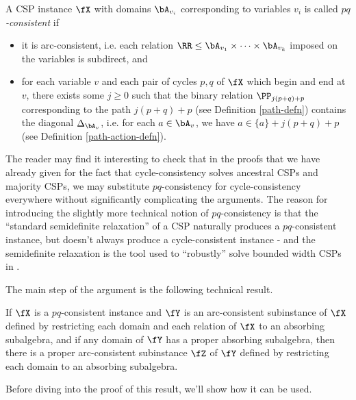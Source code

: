 \begin{defn}\label{defn-pq-consistent} A CSP instance $\fX$ with domains $\bA_{v_i}$ corresponding to variables $v_i$ is called $pq$\emph{-consistent} if
\begin{itemize}
\item it is arc-consistent, i.e. each relation $\RR \le \bA_{v_1}\times\cdots \times \bA_{v_k}$ imposed on the variables is subdirect, and
\item for each variable $v$ and each pair of cycles $p,q$ of $\fX$ which begin and end at $v$, there exists some $j \ge 0$ such that the binary relation $\PP_{j(p+q)+p}$ corresponding to the path $j(p+q)+p$ (see Definition \ref{path-defn}) contains the diagonal $\Delta_{\bA_v}$, i.e. for each $a \in \bA_v$, we have $a \in \{a\} + j(p+q)+p$ (see Definition \ref{path-action-defn}).
\end{itemize}
\end{defn}

The reader may find it interesting to check that in the proofs that we have already given for the fact that cycle-consistency solves ancestral CSPs and majority CSPs, we may substitute $pq$-consistency for cycle-consistency everywhere without significantly complicating the arguments. The reason for introducing the slightly more technical notion of $pq$-consistency is that the ``standard semidefinite relaxation'' of a CSP naturally produces a $pq$-consistent instance, but doesn't always produce a cycle-consistent instance - and the semidefinite relaxation is the tool used to ``robustly'' solve bounded width CSPs in \cite{sdp}.

The main step of the argument is the following technical result.

\begin{thm}\label{absorbing-reduction} If $\fX$ is a $pq$-consistent instance and $\fY$ is an arc-consistent subinstance of $\fX$ defined by restricting each domain and each relation of $\fX$ to an absorbing subalgebra, and if any domain of $\fY$ has a proper absorbing subalgebra, then there is a proper arc-consistent subinstance $\fZ$ of $\fY$ defined by restricting each domain to an absorbing subalgebra.
\end{thm}

Before diving into the proof of this result, we'll show how it can be used.

